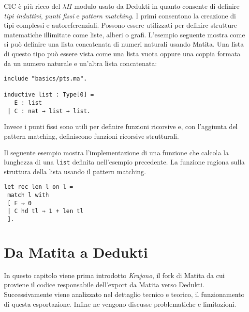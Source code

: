 \documentclass[12pt,a4paper]{report}
\begin{document}
\begin{prooftree}
\end{prooftree}

\begin{prooftree}
\end{prooftree}


CIC è più ricco del $\lambda\Pi$ modulo usato da Dedukti in quanto consente di definire 
\textit{tipi induttivi}, \textit{punti fissi} e \textit{pattern matching}.
I primi consentono la creazione di tipi complessi e autoreferenziali.
Possono essere utilizzati per definire strutture matematiche illimitate come liste,
alberi o grafi. L'esempio seguente mostra come si può definire una lista concatenata
di numeri naturali usando Matita. Una lista di questo tipo può essere vista come
una lista vuota oppure una coppia formata da un numero naturale e un'altra lista 
concatenata:

\begin{lstlisting}
include "basics/pts.ma".

inductive list : Type[0] =
   E : list
 | C : nat → list → list.

\end{lstlisting}

Invece i punti fissi sono utili per definire funzioni ricorsive e, con l'aggiunta
del pattern matching, definiscono funzioni ricorsive strutturali.

Il seguente esempio mostra l'implementazione di una funzione che calcola la lunghezza
di una \texttt{list} definita nell'esempio precedente. La funzione ragiona sulla
struttura della lista usando il pattern matching.

\begin{lstlisting}
let rec len l on l =
 match l with
 [ E ⇒ 0
 | C hd tl ⇒ 1 + len tl
 ].
\end{lstlisting}


\chapter{Da Matita a Dedukti} \label{capitoloExport}
In questo capitolo viene prima introdotto \textit{Krajono}, il fork di Matita
da cui proviene il codice responsabile dell'export da Matita verso Dedukti. 
Successivamente viene analizzato nel dettaglio tecnico e teorico, il funzionamento 
di questa esportazione. Infine ne vengono discusse problematiche e limitazioni.
\end{document}
